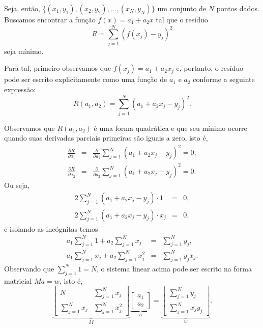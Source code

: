 Seja, então, $\{(x_1,y_1), (x_2,y_2),\ldots, (x_N,y_N)\}$ um conjunto de $N$ pontos dados. Buscamos encontrar a função $f(x) = a_1 + a_2x$ tal que o resíduo
\begin{equation*}
  R = \sum_{j=1}^N (f(x_j)-y_j)^2
\end{equation*}
seja mínimo.

Para tal, primeiro observamos que $f(x_j)=a_1+a_2 x_j$ e, portanto, o resíduo pode ser escrito explicitamente como uma função de $a_1$ e $a_2$ conforme a seguinte expressão:
\begin{equation*}
  R(a_1,a_2) = \sum_{j=1}^N (a_1 + a_2x_j - y_j)^2.
\end{equation*}


Observamos que $R(a_1,a_2)$ é uma forma quadrática e que seu mínimo ocorre quando suas derivadas parciais primeiras são iguais a zero, isto é,
\begin{eqnarray*}
  \frac{\partial R}{\partial a_1} &=& \frac{\partial }{\partial a_1} \sum_{j=1}^N (a_1 + a_2 x_j-y_j)^2 =0, \\
  \frac{\partial R}{\partial a_2} &=& \frac{\partial }{\partial a_2} \sum_{j=1}^N (a_1 + a_2 x_j-y_j)^2 =0. 
\end{eqnarray*}
Ou seja,
\begin{eqnarray*}
   2 \sum_{j=1}^N (a_1 + a_2 x_j-y_j)\cdot 1 &=&0, \\
   2 \sum_{j=1}^N (a_1 + a_2 x_j-y_j)\cdot x_j &=&0, 
\end{eqnarray*}
e isolando as incógnitas temos
\begin{eqnarray*}
   a_1\sum_{j=1}^N 1 + a_2 \sum_{j=1}^Nx_j &=&\sum_{j=1}^N y_j,\\
   a_1\sum_{j=1}^N x_j + a_2 \sum_{j=1}^Nx_j^2 &=&\sum_{j=1}^N y_jx_j.
\end{eqnarray*}
Observando que $\sum_{j=1}^N 1=N$, o sistema linear acima pode ser escrito na forma matricial $Ma = w$, isto é,
\begin{equation}\label{eq:smq_reta}
  \underbrace{\begin{bmatrix}
     N &  \sum_{j=1}^N x_j \\
     \sum_{j=1}^N x_j &  \sum_{j=1}^N x_j^2 
  \end{bmatrix}}_{M}
  \underbrace{\begin{bmatrix}
     a_1 \\
     a_2 
  \end{bmatrix}}_{a} =
  \underbrace{\begin{bmatrix}
     \sum_{j=1}^N y_j \\
     \sum_{j=1}^N x_j y_j 
  \end{bmatrix}}_{w}.
\end{equation}

